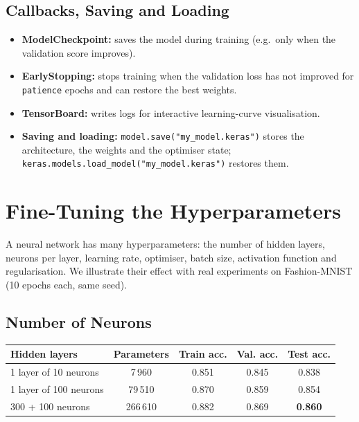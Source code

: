 \subsection{Callbacks, Saving and Loading}

\begin{itemize}
  \item \textbf{ModelCheckpoint:} saves the model during training (e.g.\ only when the validation score improves).
  \item \textbf{EarlyStopping:} stops training when the validation loss has not improved for \texttt{patience} epochs and can restore the best weights.
  \item \textbf{TensorBoard:} writes logs for interactive learning-curve visualisation.
  \item \textbf{Saving and loading:} \texttt{model.save("my\_model.keras")} stores the architecture, the weights and the optimiser state; \texttt{keras.models.load\_model("my\_model.keras")} restores them.
\end{itemize}

\section{Fine-Tuning the Hyperparameters}\label{sec:hyper}

A neural network has many hyperparameters: the number of hidden layers, neurons per layer, learning rate, optimiser, batch size, activation function and regularisation. We illustrate their effect with real experiments on Fashion-MNIST (10 epochs each, same seed).

\subsection{Number of Neurons}

\begin{center}
\begin{tabular}{@{}lcccc@{}}
\toprule
\textbf{Hidden layers} & \textbf{Parameters} & \textbf{Train acc.} & \textbf{Val. acc.} & \textbf{Test acc.}\\
\midrule
1 layer of 10 neurons & 7\,960 & 0.851 & 0.845 & 0.838\\
1 layer of 100 neurons & 79\,510 & 0.870 & 0.859 & 0.854\\
300 + 100 neurons & 266\,610 & 0.882 & 0.869 & \textbf{0.860}\\
\bottomrule
\end{tabular}
\end{center}

